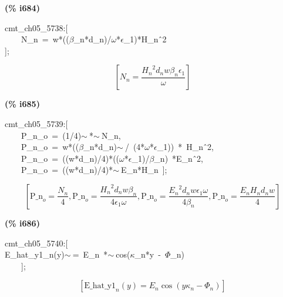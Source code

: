 \documentclass[fleqn]{article}
\begin{document}
\noindent
\begin{minipage}[t]{4.000000em}\color{red}\bfseries
(\% i684)	
\end{minipage}
\begin{minipage}[t]{\textwidth}\color{blue}
cmt\_ch05\_5738:[\\
\ \ \ \ N\_n\ =\ w*((\ensuremath{\beta}\_n*d\_n)/\ensuremath{\omega}*\ensuremath{\epsilon}\_1)*H\_n\^\ 2\\
];
\end{minipage}
\[\displaystyle \tag{\% o684} 
\left[ {N_n}=\frac{{{{H_n}}^{2}} {d_n} w {{\beta }_n} {{\epsilon }_1}}{\omega }\right] \mbox{}
\]


\noindent
\begin{minipage}[t]{4.000000em}\color{red}\bfseries
(\% i685)	
\end{minipage}
\begin{minipage}[t]{\textwidth}\color{blue}
cmt\_ch05\_5739:[\\
\ \ \ \ P\_n\_o\ =\ (1/4)\ensuremath{\sim\ }*\ensuremath{\sim\ }N\_n,\\
\ \ \ \ P\_n\_o\ =\ w*((\ensuremath{\beta}\_n*d\_n)\ensuremath{\sim\ }/\ (4*\ensuremath{\omega}*\ensuremath{\epsilon}\_1))\ *\ H\_n\^\ 2,\\
\ \ \ \ P\_n\_o\ =\ ((w*d\_n)/4)*((\ensuremath{\omega}*\ensuremath{\epsilon}\_1)/\ensuremath{\beta}\_n)\ *E\_n\^\ 2,\\
\ \ \ \ P\_n\_o\ =\ ((w*d\_n)/4)*\ensuremath{\sim\ }E\_n*H\_n\ ];
\end{minipage}
\[\displaystyle \tag{\% o685} 
\left[ {{\ensuremath{\mathrm{P\_ n}}}_o}=\frac{{N_n}}{4}\operatorname{,}{{\ensuremath{\mathrm{P\_ n}}}_o}=\frac{{{{H_n}}^{2}} {d_n} w {{\beta }_n}}{4 {{\epsilon }_1} \omega }\operatorname{,}{{\ensuremath{\mathrm{P\_ n}}}_o}=\frac{{{{E_n}}^{2}} {d_n} w {{\epsilon }_1} \omega }{4 {{\beta }_n}}\operatorname{,}{{\ensuremath{\mathrm{P\_ n}}}_o}=\frac{{E_n} {H_n} {d_n} w}{4}\right] \mbox{}
\]


\noindent
\begin{minipage}[t]{4.000000em}\color{red}\bfseries
(\% i686)	
\end{minipage}
\begin{minipage}[t]{\textwidth}\color{blue}
cmt\_ch05\_5740:[\\
E\_hat\_y1\_n(y)\ensuremath{\sim\ }=\ E\_n\ *\ensuremath{\sim\ }cos(\ensuremath{\kappa}\_n*y\ -\ \ensuremath{\Phi}\_n)\\
\ \ \ \ ];
\end{minipage}
\[\displaystyle \tag{\% o686} 
\left[ {{\ensuremath{\mathrm{E\_ hat\_ y1}}}_n}(y)={E_n} \cos{\left( y {{\kappa }_n}-{{\Phi }_n}\right) }\right] \mbox{}
\]
\end{document}
